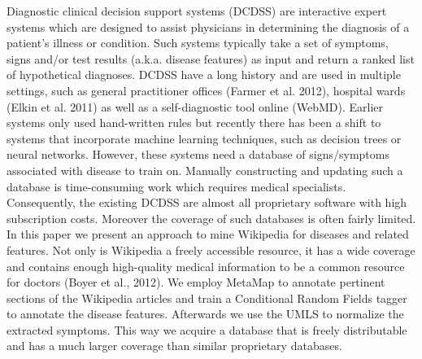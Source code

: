 \documentclass[10pt, a4paper, twopage, headinclude, footinclude, BCOR5mm]{book}
\begin{document}
\begin{table}[t!]
\end{table} 
\begin{table}[t!]
\end{table} 
\noindent
Diagnostic clinical decision support systems (DCDSS) are interactive expert systems which are designed to assist physicians in determining the diagnosis of a patient's illness or condition. Such systems typically take a set of symptoms, signs and/or test results (a.k.a. disease features) as input and return a ranked list of hypothetical diagnoses.  DCDSS have a long history and are used in multiple settings, such as general practitioner offices (Farmer et al. 2012), hospital wards (Elkin et al. 2011) as well as a self-diagnostic tool online (WebMD). Earlier systems only used hand-written rules but recently there has been a shift to systems that incorporate machine learning techniques, such as decision trees or neural networks.  However, these systems need a database of signs/symptoms associated with disease to train on. Manually constructing and updating such a database is time-consuming work which requires medical specialists. Consequently, the existing DCDSS are almost all proprietary software with high subscription costs. Moreover the coverage of such databases is often fairly limited.  In this paper we present an approach to mine Wikipedia for diseases and related features. Not only is Wikipedia a freely accessible resource, it has a wide coverage and contains enough high-quality medical information to be a common resource for doctors (Boyer et al., 2012). We employ MetaMap to annotate pertinent sections of the Wikipedia articles and train a Conditional Random Fields tagger to annotate the disease features. Afterwards we use the UMLS to normalize the extracted symptoms. This way we acquire a database that is freely distributable and has a much larger coverage than similar proprietary databases.  
\end{document}
